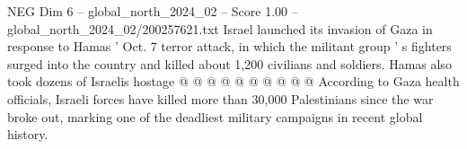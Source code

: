 \begin{textsample}{NEG Dim 6 – global\_north\_2024\_02 – Score 1.00 – global\_north\_2024\_02/200257621.txt}
Israel launched its invasion of Gaza in response to Hamas ' Oct. 7 terror attack, in which the militant group ' s fighters surged into the country and killed about 1,200 civilians and soldiers.
Hamas also took dozens of Israelis hostage @ @ @ @ @ @ @ @ @ @ According to Gaza health officials, Israeli forces have killed more than 30,000 Palestinians since the war broke out, marking one of the deadliest military campaigns in recent global history.

\end{textsample}
